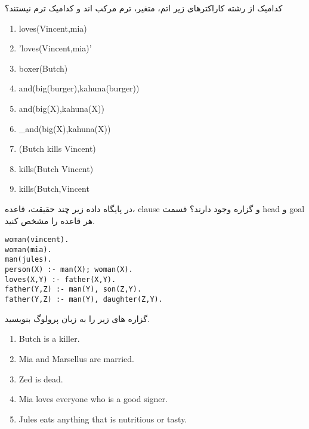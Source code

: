 \begin{exercise}
کدامیک از رشته کاراکترهای زیر اتم، متغیر، ترم مرکب اند و کدامیک ترم نیستند؟\\
\begin{latin}
\begin{enumerate}
\item loves(Vincent,mia)
\item 'loves(Vincent,mia)'
\item boxer(Butch)
\item and(big(burger),kahuna(burger))
\item and(big(X),kahuna(X))
\item \_and(big(X),kahuna(X))
\item (Butch  kills  Vincent)
\item kills(Butch  Vincent)
\item kills(Butch,Vincent
\end{enumerate}
\end{latin}
\end{exercise}

\begin{exercise}
در پایگاه داده زیر چند حقیقت، قاعده، clause و گزاره وجود دارند؟ قسمت head و goal هر قاعده را مشخص کنید.
\begin{latin}
\begin{lstlisting}
woman(vincent). 
woman(mia). 
man(jules). 
person(X) :- man(X); woman(X). 
loves(X,Y) :- father(X,Y). 
father(Y,Z) :- man(Y), son(Z,Y). 
father(Y,Z) :- man(Y), daughter(Z,Y).
\end{lstlisting}
\end{latin}
\end{exercise}

\begin{exercise}
گزاره های زیر را به زبان پرولوگ بنویسید.
\begin{latin}
\begin{enumerate}
\item Butch is a killer.
\item Mia and Marsellus are married.
\item Zed is dead.
\item Mia loves everyone who is a good signer.
\item Jules eats anything that is nutritious or tasty.
\end{enumerate}
\end{latin}
\end{exercise}

